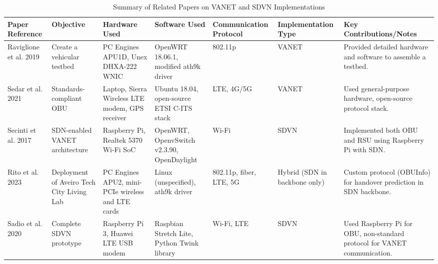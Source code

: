     \begin{table}[ht]
        \centering
        \begin{tabular}{|p{1.5cm}|p{1.7cm}|p{2cm}|p{1.6cm}|p{1.6cm}|p{1.8cm}|p{2.5cm}|}
        \hline
        \textbf{Paper Reference} & \textbf{Objective} & \textbf{Hardware Used} & \textbf{Software Used} & \textbf{Commu\-nication Protocol} & \textbf{Imple\-mentation Type} & \textbf{Key Contributions/Notes} \\ \hline
        
        Raviglione et al. 2019\cite{raviglione_open_2019} & Create a vehicular testbed & PC Engines APU1D, Unex DHXA-222 WNIC & OpenWRT 18.06.1, modified ath9k driver & 802.11p & VANET & Provided detailed hardware and software to assemble a testbed. \\ \hline
        
        Sedar et al. 2021\cite{sedar_standards-compliant_2021} & Standards-compliant OBU & Laptop, Sierra Wireless LTE modem, GPS receiver & Ubuntu 18.04, open-source ETSI C-ITS stack & LTE, 4G/5G & VANET & Used general-purpose hardware, open-source protocol stack. \\ \hline
        
        Secinti et al. 2017\cite{secinti_software_2017} & SDN-enabled VANET architecture & Raspberry Pi, Realtek 5370 Wi-Fi SoC & OpenWRT, OpenvSwitch v2.3.90, OpenDaylight & Wi-Fi & SDVN & Implemented both OBU and RSU using Raspberry Pi with SDN. \\ \hline
        
        Rito et al. 2023\cite{rito_aveiro_2023} & Deployment of Aveiro Tech City Living Lab & PC Engines APU2, mini-PCIe wireless and LTE cards & Linux (unspecified), ath9k driver & 802.11p, fiber, LTE, 5G & Hybrid (SDN in backbone only) & Custom protocol (OBUInfo) for handover prediction in SDN backbone. \\ \hline
        
        Sadio et al. 2020\cite{sadio_design_2020} & Complete SDVN prototype & Raspberry Pi 3, Huawei LTE USB modem & Raspbian Stretch Lite, Python Twink library & Wi-Fi, LTE & SDVN & Used Raspberry Pi for OBU, non-standard protocol for VANET communication. \\ \hline
        
        \end{tabular}
        \caption{Summary of Related Papers on VANET and SDVN Implementations}
    \end{table}
        